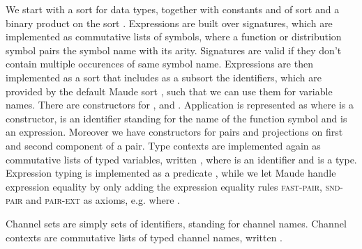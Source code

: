 We start with a sort  for data types, together with 
constants  and  of sort  and a
binary product on the sort . Expressions are built over
signatures, which are implemented as commutative lists of symbols,
where a function or distribution symbol pairs the symbol name with 
its arity. Signatures are valid if they don't contain multiple
occurences of same symbol name. Expressions are then implemented
as a sort  that includes as a subsort the identifiers,
which are provided by the default Maude sort ,
such that we can use them for variable names. There are constructors
for ,  and \code{()}. Application is 
represented as  where  is a constructor, 
is an identifier standing for the name of the function symbol and
 is an expression. Moreover we have constructors for
pairs and projections on first and second component of a pair. 
Type contexts are implemented again as commutative lists of typed
variables, written , where  is an identifier and
 is a type. Expression typing is 
implemented as a predicate 
, while
we let Maude handle expression equality by only adding the expression
equality rules \textsc{fast-pair}, \textsc{snd-pair} and 
\textsc{pair-ext} as axioms, e.g.
 where .

Channel sets are simply sets of identifiers, standing for channel
names. Channel contexts are commutative lists of typed channel
names, written .

